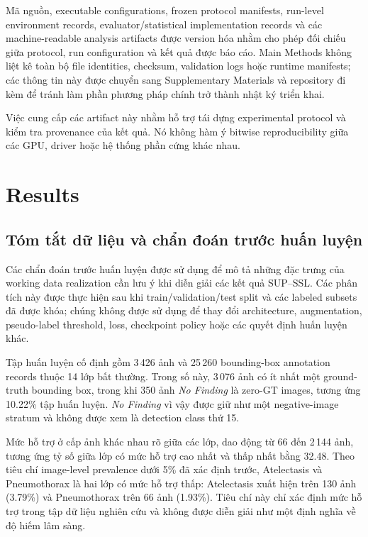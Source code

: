 \documentclass[pdflatex,sn-mathphys-num]{sn-jnl}%
\theoremstyle{thmstyleone}%
\theoremstyle{thmstyletwo}%
\theoremstyle{thmstylethree}%
\begin{document}
Mã nguồn, executable configurations, frozen protocol manifests,
run-level environment records, evaluator/statistical implementation
records và các machine-readable analysis artifacts được version hóa nhằm
cho phép đối chiếu giữa protocol, run configuration và kết quả được báo
cáo. Main Methods không liệt kê toàn bộ file identities, checksum,
validation logs hoặc runtime manifests; các thông tin này được chuyển sang
Supplementary Materials và repository đi kèm để tránh làm phần phương pháp
chính trở thành nhật ký triển khai.

Việc cung cấp các artifact này nhằm hỗ trợ tái dựng experimental protocol
và kiểm tra provenance của kết quả. Nó không hàm ý bitwise reproducibility
giữa các GPU, driver hoặc hệ thống phần cứng khác nhau.

\section{Results}
\label{sec:results}

\subsection{Tóm tắt dữ liệu và chẩn đoán trước huấn luyện}
\label{sec:results_pretraining_diagnostics}

Các chẩn đoán trước huấn luyện được sử dụng để mô tả những đặc trưng của working data realization cần lưu ý khi diễn giải các kết quả SUP--SSL. Các phân tích này được thực hiện sau khi train/validation/test split và các labeled subsets đã được khóa; chúng không được sử dụng để thay đổi architecture, augmentation, pseudo-label threshold, loss, checkpoint policy hoặc các quyết định huấn luyện khác.

Tập huấn luyện cố định gồm 3\,426 ảnh và 25\,260 bounding-box annotation records thuộc 14 lớp bất thường. Trong số này, 3\,076 ảnh có ít nhất một ground-truth bounding box, trong khi 350 ảnh \textit{No Finding} là zero-GT images, tương ứng 10.22\% tập huấn luyện. \textit{No Finding} vì vậy được giữ như một negative-image stratum và không được xem là detection class thứ 15.

Mức hỗ trợ ở cấp ảnh khác nhau rõ giữa các lớp, dao động từ 66 đến 2\,144 ảnh, tương ứng tỷ số giữa lớp có mức hỗ trợ cao nhất và thấp nhất bằng 32.48. Theo tiêu chí image-level prevalence dưới 5\% đã xác định trước, Atelectasis và Pneumothorax là hai lớp có mức hỗ trợ thấp: Atelectasis xuất hiện trên 130 ảnh (3.79\%) và Pneumothorax trên 66 ảnh (1.93\%). Tiêu chí này chỉ xác định mức hỗ trợ trong tập dữ liệu nghiên cứu và không được diễn giải như một định nghĩa về độ hiếm lâm sàng.
\end{document}
